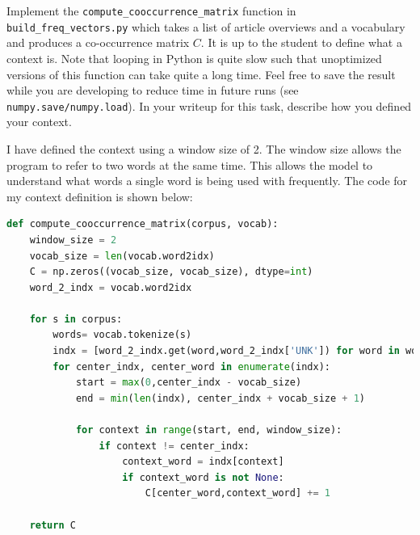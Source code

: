\documentclass[a4paper,10pt]{article}
\begin{document}
\vspace{5pt}
\begin{taskbox}
 Implement the \texttt{compute\_cooccurrence\_matrix} function in \texttt{build\_freq\_vectors.py} which takes a list of article overviews and a vocabulary and produces a co-occurrence matrix $C$. It is up to the student to define what a context is. Note that looping in Python is quite slow such that unoptimized versions of this function can take quite a long time. Feel free to save the result while you are developing to reduce time in future runs (see \texttt{numpy.save/numpy.load}). In your writeup for this task, describe how you defined your context.
\end{taskbox}
\begin{answerbox}
    I have defined the context using a window size of 2. The window size allows the program to refer to two words at the same time. This allows the model to understand what words a single word is being used with frequently.
    The code for my context definition is shown below:
    \begin{lstlisting}[language=Python]
def compute_cooccurrence_matrix(corpus, vocab):
	window_size = 2
	vocab_size = len(vocab.word2idx)
	C = np.zeros((vocab_size, vocab_size), dtype=int)
	word_2_indx = vocab.word2idx

	for s in corpus:
		words= vocab.tokenize(s)
		indx = [word_2_indx.get(word,word_2_indx['UNK']) for word in words]
		for center_indx, center_word in enumerate(indx):
			start = max(0,center_indx - vocab_size)
			end = min(len(indx), center_indx + vocab_size + 1)

			for context in range(start, end, window_size):
				if context != center_indx:
					context_word = indx[context]
					if context_word is not None:
						C[center_word,context_word] += 1

	return C
    \end{lstlisting}
\end{answerbox}
\vspace{5pt}
\end{document}
